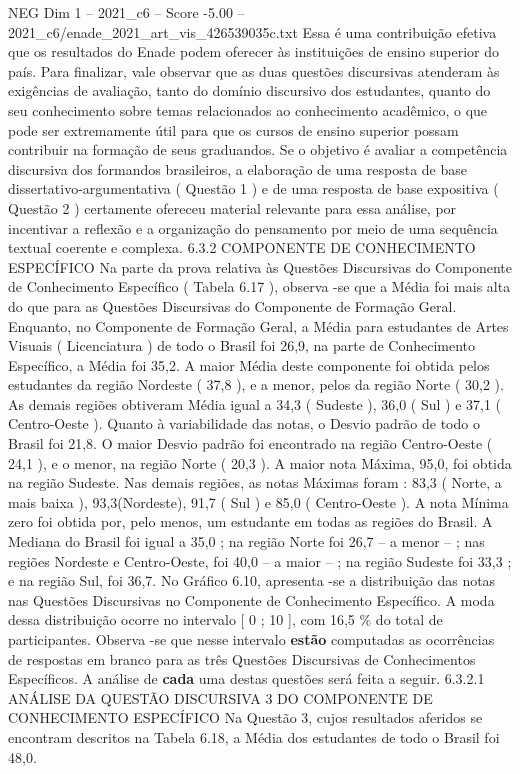 \begin{textsample}{NEG Dim 1 – 2021\_c6 – Score -5.00 – 2021\_c6/enade\_2021\_art\_vis\_426539035c.txt}
Essa é uma contribuição efetiva que os resultados do Enade podem oferecer às instituições de ensino superior do país.
Para finalizar, vale observar que as duas questões discursivas atenderam às exigências de avaliação, tanto do domínio discursivo dos estudantes, quanto do seu conhecimento sobre temas relacionados ao conhecimento acadêmico, o que pode ser extremamente útil para que os cursos de ensino superior possam contribuir na formação de seus graduandos.
Se o objetivo é avaliar a competência discursiva dos formandos brasileiros, a elaboração de uma resposta de base dissertativo-argumentativa ( Questão 1 ) e de uma resposta de base expositiva ( Questão 2 ) certamente ofereceu material relevante para essa análise, por incentivar a reflexão e a organização do pensamento por meio de uma sequência textual coerente e complexa. 6.3.2 COMPONENTE DE CONHECIMENTO ESPECÍFICO Na parte da prova relativa às Questões Discursivas do Componente de Conhecimento Específico ( Tabela 6.17 ), observa -se que a Média foi mais alta do que para as Questões Discursivas do Componente de Formação Geral.
Enquanto, no Componente de Formação Geral, a Média para estudantes de Artes Visuais ( Licenciatura ) de todo o Brasil foi 26,9, na parte de Conhecimento Específico, a Média foi 35,2.
A maior Média deste componente foi obtida pelos estudantes da região Nordeste ( 37,8 ), e a menor, pelos da região Norte ( 30,2 ).
As demais regiões obtiveram Média igual a 34,3 ( Sudeste ), 36,0 ( Sul ) e 37,1 ( Centro-Oeste ).
Quanto à variabilidade das notas, o Desvio padrão de todo o Brasil foi 21,8.
O maior Desvio padrão foi encontrado na região Centro-Oeste ( 24,1 ), e o menor, na região Norte ( 20,3 ).
A maior nota Máxima, 95,0, foi obtida na região Sudeste.
Nas demais regiões, as notas Máximas foram : 83,3 ( Norte, a mais baixa ), 93,3(Nordeste), 91,7 ( Sul ) e 85,0 ( Centro-Oeste ).
A nota Mínima zero foi obtida por, pelo menos, um estudante em todas as regiões do Brasil.
A Mediana do Brasil foi igual a 35,0 ; na região Norte foi 26,7 – a menor – ; nas regiões Nordeste e Centro-Oeste, foi 40,0 – a maior – ; na região Sudeste foi 33,3 ; e na região Sul, foi 36,7.
No Gráfico 6.10, apresenta -se a distribuição das notas nas Questões Discursivas no Componente de Conhecimento Específico.
A moda dessa distribuição ocorre no intervalo [ 0 ; 10 ], com 16,5 \% do total de participantes.
Observa -se que nesse intervalo \textbf{estão} computadas as ocorrências de respostas em branco para as três Questões Discursivas de Conhecimentos Específicos.
A análise de \textbf{cada} uma destas questões será feita a seguir. 6.3.2.1 ANÁLISE DA QUESTÃO DISCURSIVA 3 DO COMPONENTE DE CONHECIMENTO ESPECÍFICO Na Questão 3, cujos resultados aferidos se encontram descritos na Tabela 6.18, a Média dos estudantes de todo o Brasil foi 48,0.

\end{textsample}
